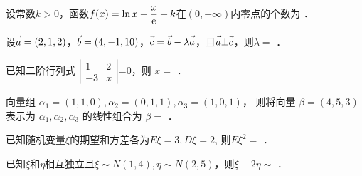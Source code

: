 \documentclass{jnuexam}
\begin{document}
\renewcommand{\niandu}{2017--2018}
\renewcommand{\xueqi}{2}
\renewcommand{\kecheng}{大学数学}
\renewcommand{\zhuanye}{理工四学分} %
\renewcommand{\jiaoshi}{张三，李四，王五} %
\renewcommand{\shijian}{2018~年~06~月~28~日}
\renewcommand{\bixiu}{1} %
\renewcommand{\bijuan}{1} %
\renewcommand{\shijuan}{A} %
\renewcommand{\neizhao}{1} %
\renewcommand{\waizhao}{0} %

\makehead %



\newpageb %

\begin{problem}
设常数$k>0$，函数$f(x)=\ln x-\dfrac{x}{\mathrm{e}}+k$在$(0,+\infty)$内零点的个数为 ．
\end{problem}

\vfill

\begin{problem}
设$\va=(2,1,2)$，$\vec{b}=(4,-1,10)$，$\vc=\vb-\lambda\va$，且$\va\bot\vc$，则$\lambda=$ ．
\end{problem}

\vfill

\begin{problem}
已知二阶行列式 $\text{$\left|\begin{array}{cc}
  1 & 2\\
  - 3 & x
\end{array}\right|$=0}$，则 $x=$ ．
\end{problem}

\vfill

\begin{problem}
向量组 $\alpha_1=(1,1,0), \alpha_2=(0,1,1), \alpha_3=(1,0,1)$，
则将向量 $\beta=(4, 5, 3)$ 表示为 $\alpha_1, \alpha_2, \alpha_3$
的线性组合为 $\beta=$ ．
\end{problem}

\vfill

\begin{problem}
已知随机变量$\xi$的期望和方差各为$E\xi=3, D\xi=2$, 则$E\xi^2=$ ．
\end{problem}

\vfill

\begin{problem}
已知$\xi$和$\eta$相互独立且$\xi\sim N(1,4), \eta\sim N(2,5)$，则$\xi-2\eta\sim$ ．
\end{problem}
\end{document}
